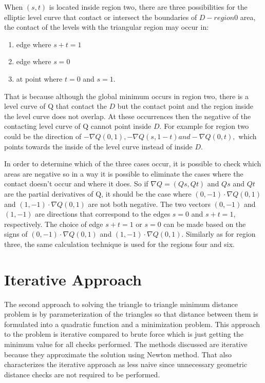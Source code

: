 \documentclass[times,12pt]{ACME2015article}
\begin{document}
When $(s, t)$ is located inside region two, there are three possibilities for the elliptic level curve that contact or intersect the boundaries of $D - region0$ area, the contact of the levels with the triangular region may occur in: 
\begin{enumerate}
\item edge where $s + t = 1$ 
\item edge where $s = 0$
\item at point where $t = 0$ and $s = 1$.
\end{enumerate}

That is because although the global minimum occurs in region two, there is a level curve of Q that contact the $D$ but the contact point and the region inside the level curve does not overlap. At these occurrences then the negative of the contacting level curve of Q cannot point inside $D$. For example for region two could be the direction of $-\nabla Q(0,1), -\nabla Q(s,1-t) and -\nabla Q(0,t),$ which points towards the inside of the level curve instead of inside $D$. 

In order to determine which of the three cases occur, it is possible to check which areas are negative so in a way it is possible to eliminate the cases where the contact doesn't occur and where it does. So if $\nabla Q = (Qs, Qt)$ and $Qs$ and $Qt$ are the partial derivatives of Q, it should be the case where $(0, -1) \cdot \nabla Q(0, 1)$ and $(1, -1) \cdot \nabla Q(0, 1)$ are not both  negative. The two vectors $(0, −1)$ and $(1, −1)$ are directions that correspond to the edges $s = 0$ and $s + t = 1$, respectively. The choice of edge $s+t = 1$ or $s = 0$ can be made based on the signs of $(0,-1) \cdot \nabla Q(0,1)$ and $(1, -1) \cdot \nabla Q(0, 1)$. Similarly as for region three, the same calculation technique is used for the regions four and six. 

\clearpage

\section{Iterative Approach}
The second approach to solving the triangle to triangle minimum distance problem is by parameterization of the triangles so that distance between them is formulated into a quadratic function and a minimization problem. This approach to the problem is iterative compared to brute force which is just getting the minimum value for all checks performed. The methods discussed are iterative because they approximate the solution using Newton method. That also characterizes the iterative approach as less naive since unnecessary geometric distance checks are not required to be performed.
\end{document}
